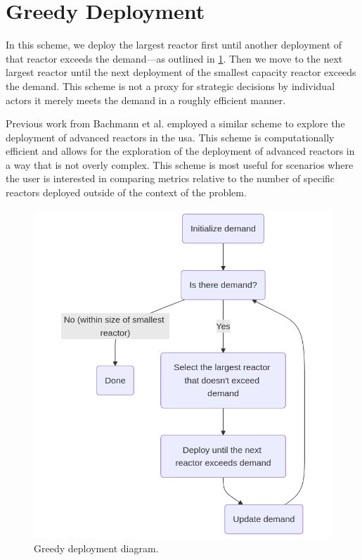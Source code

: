 \section{Greedy Deployment}
\label{sec:greedy_deployment}

In this scheme, we deploy the largest reactor first until another
deployment of that reactor exceeds the demand---as outlined in
\ref{fig:greedy_diagram}. Then we move to the next largest reactor until the
next deployment of the smallest capacity reactor exceeds the
demand. This scheme is not a proxy for strategic decisions by individual
actors it merely meets the demand in a roughly efficient manner.

Previous work from Bachmann et al. \cite{bachmann_enrichment_2021}
employed a similar scheme to explore the deployment of advanced
reactors in the \gls{usa}. This scheme is computationally efficient and allows
for the exploration of the deployment of advanced reactors in a way that is not
overly complex. This scheme is most useful for scenarios where the user is
interested in comparing metrics relative to the number of specific reactors
deployed outside of the context of the problem.

\begin{figure}[H]
    \centering
    \includegraphics[scale=0.3]{images/schemes/greedy_diagram.png}
    \caption{Greedy deployment diagram.}
    \label{fig:greedy_diagram}
\end{figure}

